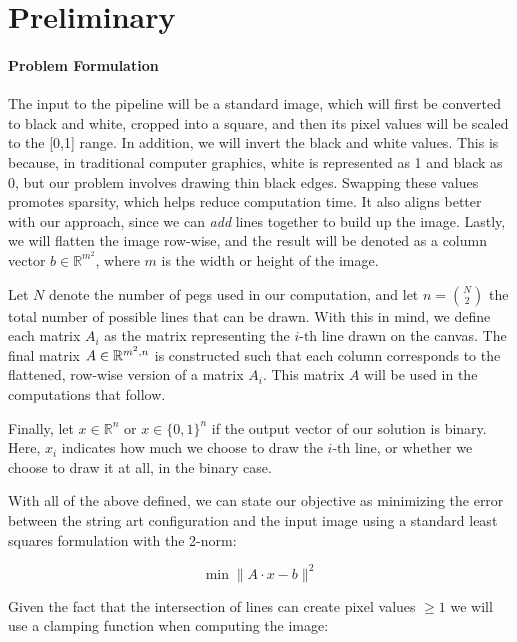 \chapter{Preliminary}

\subsubsection{Problem Formulation}
\label{sec:problem_formulation}

The input to the pipeline will be a standard image, which will first be converted to black and white, cropped into a square, and then its pixel values will be scaled to the [0,1] range. In addition, we will invert the black and white values. This is because, in traditional computer graphics, white is represented as 1 and black as 0, but our problem involves drawing thin black edges. Swapping these values promotes sparsity, which helps reduce computation time. It also aligns better with our approach, since we can \textit{add} lines together to build up the image. Lastly, we will flatten the image row-wise, and the result will be denoted as a column vector \(b \in \mathbb{R}^{m^2}\), where \(m\) is the width or height of the image.

Let \(N\) denote the number of pegs used in our computation, and let \(n = \binom{N}{2}\) the total number of possible lines that can be drawn. With this in mind, we define each matrix \(A_i\) as the matrix representing the \(i\text{-th}\) line drawn on the canvas. The final matrix \(A \in \mathbb{R}^{m^2, \space n}\) is constructed such that each column corresponds to the flattened, row-wise version of a matrix \(A_i\). This matrix \(A\) will be used in the computations that follow.

Finally, let \(x \in \mathbb{R}^n\) or \(x \in \{0, 1\}^n\) if the output vector of our solution is binary. Here, \(x_i\) indicates how much we choose to draw the \(i\text{-th}\) line, or whether we choose to draw it at all, in the binary case.

With all of the above defined, we can state our objective as minimizing the error between the string art configuration and the input image using a standard least squares formulation with the 2-norm:

\begin{equation}
\min{\| A \cdot x - b \|^2}
\label{eq:least_squares}
\end{equation}

Given the fact that the intersection of lines can create pixel values \(\geq1\) we will use a clamping function when computing the image:

